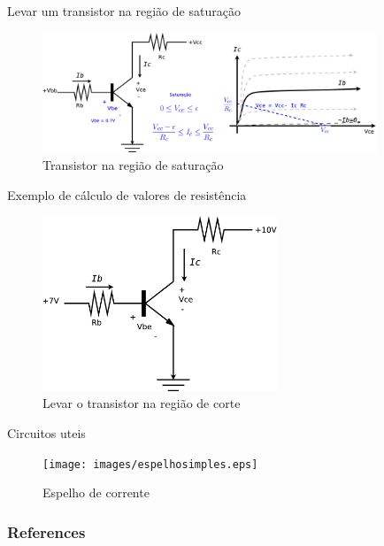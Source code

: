 \documentclass[envcountsect,dvips]{beamer}
\begin{document}
\begin{frame}{Levar um transistor na região de saturação}
\begin{figure}
\centering
\includegraphics[width=10cm]{images/emisorcomun3.eps}
\caption{Transistor na região de saturação}
\label{fig:emisorcomun3}
\end{figure}
\end{frame}

\begin{frame}{Exemplo de cálculo de valores de resistência}
\begin{figure}
\centering
\includegraphics[width=7cm]{images/ejemplo1.eps}
\caption{Levar o transistor na região de corte}
\label{fig:ejemplo1a}
\end{figure}
\end{frame}

\begin{frame}{Circuitos uteis}
\begin{figure}
\centering
\texttt{[image: images/espelhosimples.eps]}
\caption{Espelho de corrente}
\label{fig:ejemplo1a}
\end{figure}
\end{frame}

\begin{frame}[allowframebreaks]
        \frametitle{References}
        

\end{frame}
\end{document}

